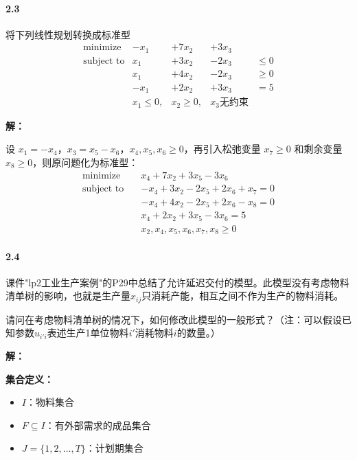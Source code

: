 \documentclass[12pt,a4paper]{article}
\begin{document}
\paragraph{2.3}
将下列线性规划转换成标准型
\begin{equation*}
	\begin{aligned}
	\text{minimize}  & -x_1&+7x_2 &+3x_3 &\\
	\text{subject to}& x_1 &+3x_2  &-2x_3    &\leq 0 \\
	&x_1 &+4x_2  &-2x_3  &\geq 0  \\
	&-x_1 &+2x_2  &+3x_3    &=  5  \\
	&x_1 \leq 0, &x_2 \geq 0, &x_3  \text{无约束}&  
	\end{aligned}
\end{equation*}

\textbf{解：}

设 $x_1=-x_4$，$x_3=x_5-x_6$，$x_4,x_5,x_6\ge 0$，再引入松弛变量 $x_7\ge0$ 和剩余变量 $x_8\ge0$，则原问题化为标准型：
\begin{equation*}
\begin{aligned}
\text{minimize}   \quad & x_4+7x_2+3x_5-3x_6 \\
\text{subject to} \quad
& -x_4+3x_2-2x_5+2x_6+x_7 = 0 \\
& -x_4+4x_2-2x_5+2x_6-x_8 = 0 \\
&  x_4+2x_2+3x_5-3x_6       = 5 \\
& x_2,x_4,x_5,x_6,x_7,x_8\ge 0
\end{aligned}
\end{equation*}


\paragraph{2.4}
课件"lp2工业生产案例"的P29中总结了允许延迟交付的模型。此模型没有考虑物料清单树的影响，也就是生产量$x_{ij}$只消耗产能，相互之间不作为生产的物料消耗。

请问在考虑物料清单树的情况下，如何修改此模型的一般形式？（注：可以假设已知参数$u_{i'i}$表述生产1单位物料$i'$消耗物料$i$的数量。）

\textbf{解：}

\textbf{集合定义：}
\begin{itemize}
    \item $I$：物料集合
    \item $F \subseteq I$：有外部需求的成品集合
    \item $J = \{1, 2, \dots, T\}$：计划期集合
\end{itemize}
\end{document}
